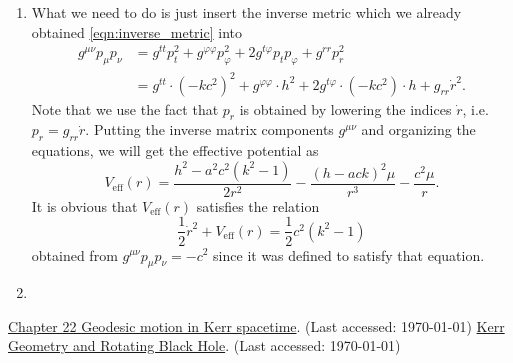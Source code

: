 \documentclass[a4paper,pdftex,10pt]{article}
\begin{document}
\begin{enumerate}
        \item 

        What we need to do is just insert the inverse metric which we already obtained \eqref{eqn:inverse_metric} into
        \begin{align}
          g^{\mu\nu}p_{\mu}p_{\nu}
          &=
          g^{tt}p_{t}^2
          +
          g^{\varphi\varphi}p_{\varphi}^2
          +
          2g^{t\varphi}p_{t}p_{\varphi}
          +
          g^{rr}p_{r}^2
          \nonumber
          \\
          &=
          g^{tt}\cdot(-kc^2)^2
          +
          g^{\varphi\varphi}\cdot h^2
          +
          2g^{t\varphi}\cdot(-kc^2)\cdot h
          +
          g_{rr}\dot{r}^2
          .
        \end{align}
        Note that we use the fact that $p_{r}$ is obtained by lowering the indices $\dot{r}$, i.e. $p_{r}=g_{rr}\dot{r}$. Putting the inverse matrix components $g^{\mu\nu}$ and organizing the equations, we will get the effective potential as 
        \begin{equation}
          V_{\mathrm{eff}}(r)
          =
          \frac{h^2-a^2c^2(k^2-1)}{2r^2}
          -
          \frac{(h-ack)^2\mu}{r^3}
          -
          \frac{c^2\mu}{r}
          .
        \end{equation}
        It is obvious that $V_{\mathrm{eff}}(r)$ satisfies the relation
        \begin{equation}
          \frac{1}{2}\dot{r}^2
          +
          V_{\mathrm{eff}}(r)
          =
          \frac{1}{2}c^2(k^2-1)
        \end{equation}
        obtained from $g^{\mu\nu}p_{\mu}p_{\nu}=-c^2$ since it was defined to satisfy that equation.


        \item 
        








\end{enumerate}


\clearpage
\begin{thebibliography}{99}
  \href{https://www.roma1.infn.it/teongrav/onde19_20/geodetiche_Kerr.pdf}{Chapter 22 Geodesic motion in Kerr spacetime}. (Last accessed: \today)
  \href{https://www.pas.rochester.edu/assets/pdf/undergraduate/kerr_geometry_and_rotating_black_holes.pdf}{Kerr Geometry and Rotating Black Hole}. (Last accessed: \today)
\end{thebibliography}
\end{document}
